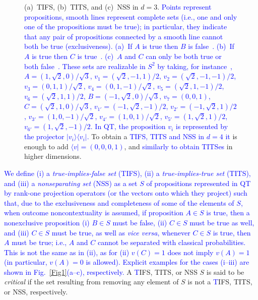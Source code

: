 \documentclass[%
  twocolumn,
 showpacs,
 showkeys,
 preprintnumbers,
 amsmath,amssymb,
 aps,
  pra,
  longbibliography,
 floatfix,
 ]{revtex4-1}
\newcommand{\karl}[1]{\textcolor{blue}{#1}}
\begin{document}
\begin{figure}
{(a)~TIFS,  (b)~TITS, and (c)~NSS in $d=3$.
\karl{Points represent propositions, smooth lines represent complete sets
(i.e., one and only one of the propositions must be true); in particular, they indicate
that any pair of propositions connected by a smooth line cannot both be true (exclusiveness).}
\karl{(a)~If $A$ is true then $B$ is false~\cite[Fig.~1, p.~182]{code2}.
(b)~If $A$ is true then $C$ is true~\cite[$\Gamma_1$]{KS67}.
(c)~$A$ and $C$ can only be both true or both false~\cite[$\Gamma_3$]{KS67}.
These sets are realizable in  $S^2$ by taking,
for instance~\cite[p.~206, Fig.~1]{tkadlec-96},
$A     = (    1,\sqrt{2},0     )/\sqrt{3}$,
$v_1     = (   \sqrt{2},-1,1     )/2$,
$v_2     = (   \sqrt{2},-1,-1     )/2$,
$v_3     = (    0,1,1     )/\sqrt{2}$,
$v_4     = (    0,1,-1     )/\sqrt{2}$,
$v_5     = (   \sqrt{2},1,-1     )/2$,
$v_6     = (   \sqrt{2},1,1     )/2$,
$B   = (    -1,\sqrt{2},0     )/\sqrt{3}$,
$v_7          = (    0,0,1     ) $,
$C     = (   \sqrt{2},1,0     )/\sqrt{3} $,
$v_{1'}     = (    -1,\sqrt{2},-1     )/2 $,
$v_{2'}     = (    -1,\sqrt{2},1     )/2 $,
$v_{3'}     = (    1,0,-1     )/\sqrt{2} $,
$v_{4'}     = (    1,0,1     )/\sqrt{2} $,
$v_{5'}     = (    1,\sqrt{2},1     )/2 $,
$v_{6'}     = (    1,\sqrt{2},-1     )/2 $.
In QT, the proposition $v_i$ is represented by the projector $| v_i \rangle\langle v_i |$.
}
To obtain a \karl{TIFS, TITS and NSS in $d=4$ it}
is enough to add \karl{$\langle v| = (0,0,0,1)$}, and \karl{similarly to obtain TITSes} in higher dimensions.}
\end{figure}

\karl{We define
(i) a {\em true-implies-false set} (TIFS),
(ii) a {\em true-implies-true set} (TITS),
and
(iii) a {\em nonseparating set} (NSS)
as a set $S$ of propositions represented in
QT by rank-one projection operators (or the vectors onto which they project) such that,
due to the exclusiveness and completeness of some of the elements of $S$,
when outcome noncontextuality is assumed,
if proposition $A \in S$ is true,
then a nonexclusive proposition
(i)
$B \in S$  must be false,
(ii)
$C \in S$  must be true as well,
and
(iii)  $C \in S$ must be true, as well as {\it vice versa}, whenever  $C \in S$ is true, then $A$ must be true; i.e.,
$A$ and $C$ cannot be separated with classical probabilities.
This is not the same as in (ii), as for (ii) $v(C)=1$  does not imply $v(A)=1$ (in particular, $v(A)=0$ is allowed).
Explicit examples for the cases (i--iii) are shown in Fig.~\ref{Fig1}(a--c), respectively.}
A {\karl TIFS, TITS, or NSS} $S$ is said to be {\em critical}
if the set resulting from removing any element of $S$ is not a {\karl TIFS, TITS, or NSS, respectively.}
\end{document}

